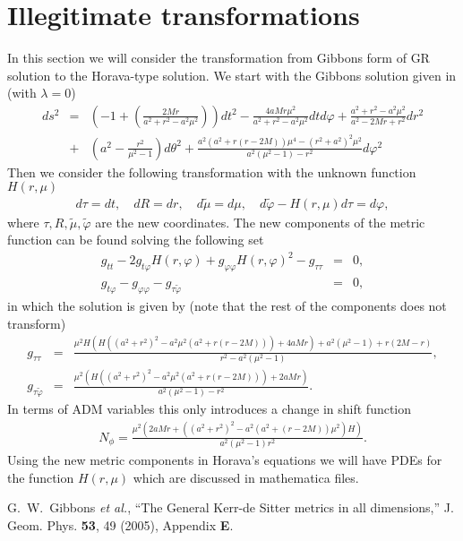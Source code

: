 \documentclass[preprint,aps,tightenlines,showkeys,nofootinbib,superscriptaddress,graphicx]{revtex4}
\begin{document}
\section{Illegitimate transformations}
In this section we will consider the transformation from Gibbons form
of GR solution to the Horava-type solution. We start with the Gibbons
solution given in \cite{Gibb:2004} (with $\lambda = 0$)
\begin{eqnarray}
  ds^{2} &= & \left(  -1+\left(\frac{2Mr}{a^{2}+r^{2}-a^{2}\mu ^{2}
  }\right)\right)dt^2
  -\frac{4aMr \mu^{2}}{a^{2}+r^{2}-a^2 \mu^2   }dt d
  \varphi+\frac{a^{2}+r^{2}-a^{2}\mu ^{2}    }{a^{2}-2Mr+r^{2}  }dr^2
  \nonumber\\
  & +& \left(a^{2} - \frac{r^{2}}{\mu ^{2}-1 } \right)d \theta ^{2}
  +\frac{a^2(a^2+r(r-2M))\mu ^{4}-(r^2+a^2)^2 \mu ^2}{a^2(\mu
  ^2-1)-r^2 }d \varphi ^2
\end{eqnarray}
Then we consider the following transformation with the unknown
function $H(r,\mu )$
\begin{eqnarray}
  d \tau  = dt,\quad dR=dr,\quad d \tilde \mu  = d \mu, \quad d
  \tilde \varphi -H(r,\mu )d \tau = d \varphi,
\end{eqnarray}
where $\tau ,R,\tilde \mu , \tilde \varphi $ are the new coordinates.
The new components of the metric
function can be found solving the following set
\begin{eqnarray}
  g_{t t}-2g_{t \varphi }H(r,\varphi )+g_{\varphi \varphi
  }H(r,\varphi )^{2}-g_{\tau \tau }&=&0,\\
  g_{t \varphi }-g_{\varphi  \varphi }-g_{\tau \tilde \varphi }&=&0,
\end{eqnarray}
in which the solution is given by (note that the rest of the
components does not transform)
\begin{eqnarray}
  g_{\tau \tau} &=& \frac{{\mu }^2 H \left(H
      \left(\left(a^2+r^2\right)^2-a^2 {\mu }^2 \left(a^2+r (r-2
    M)\right)\right)+4 a M r\right)+a^2 \left({\mu }^2-1\right)+r (2
  M-r)}{r^2-a^2 \left({\mu }^2-1\right)},\\
  g_{\tau \tilde\varphi} &=&\frac{\mu ^2 \left(H
      \left(\left(a^2+r^2\right)^2-a^2 \mu ^2 \left(a^2+r (r-2
  M)\right)\right)+2 a M r\right)}{a^2 \left(\mu ^2-1\right)-r^2}.
\end{eqnarray}
In terms of ADM variables this only introduces a change in shift function
\begin{eqnarray}
  N_{\phi} = \frac{\mu ^{2}(2aMr+((a^{2}+r^2 )^{2}-a^{2}(a^{2}+(r-2M)
  )\mu ^{2}   )H) }{a^{2}(\mu^{2}-1 ) r^{2} }.
\end{eqnarray}
Using the new metric components in Horava's equations we will have
PDEs for the function $H(r,\mu )$ which are discussed in mathematica files.
\begin{thebibliography}{999}

  G.~W.~Gibbons \textit{et al.},
  ``The General Kerr-de Sitter metrics in all dimensions,''
  J. Geom. Phys. \textbf{53}, 49
  (2005), Appendix {\bf E}.

\end{thebibliography}
\end{document}
